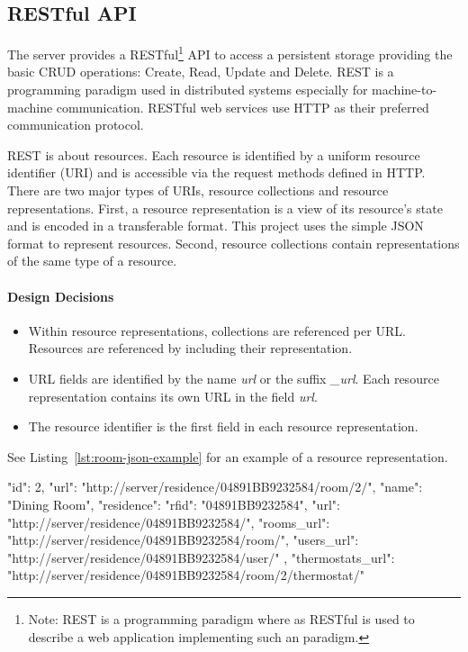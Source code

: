 \subsection{RESTful API}

The server provides a RESTful\footnote{Note: REST is a programming paradigm where as RESTful is used to describe a web application implementing such an paradigm.} API to access a persistent storage providing the basic CRUD operations: Create, Read, Update and Delete.
REST is a programming paradigm used in distributed systems especially for machine-to-machine communication.
RESTful web services use HTTP as their preferred communication protocol.

REST is about resources.
Each resource is identified by a uniform resource identifier (URI) and is accessible via the request methods defined in HTTP.
There are two major types of URIs, resource collections and resource representations.
First, a resource representation is a view of its resource's state and is encoded in a transferable format.
This project uses the simple JSON format to represent resources.
Second, resource collections contain representations of the same type of a resource.

\paragraph{Design Decisions}

\begin{itemize}
    \itemsep0em
    \item Within resource representations, collections are referenced per URL. Resources are referenced by including their representation.
    \item URL fields are identified by the name \emph{url} or the suffix \emph{\_url}. Each resource representation contains its own URL in the field \emph{url}.
    \item The resource identifier is the first field in each resource representation.
\end{itemize}

See Listing~\ref{lst:room-json-example} for an example of a resource representation.

\begin{snippet}[language=JavaScript,label={lst:room-json-example},caption={Example representation of a Room resource. The \emph{url} field determines the URL of the represented resource. Within the \emph{residence} field the representation of the associated Residence resource is nested. The included Residence representation has its own \emph{url} field. Collections of the Residence's Rooms and Users are not nested but referenced via URL to limit the response size.}]
	{
		"id": 2,
		"url": "http://server/residence/04891BB9232584/room/2/",
		"name": "Dining Room",
		"residence": {
			"rfid": "04891BB9232584",
			"url": "http://server/residence/04891BB9232584/",
			"rooms_url": "http://server/residence/04891BB9232584/room/",
			"users_url": "http://server/residence/04891BB9232584/user/"
		},
		"thermostats_url": "http://server/residence/04891BB9232584/room/2/thermostat/"
	}
\end{snippet}


